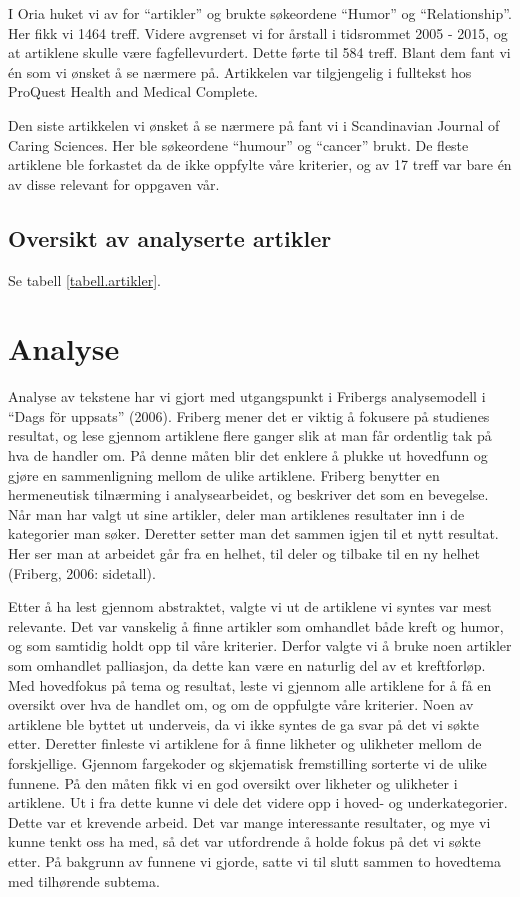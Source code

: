 I Oria huket vi av for “artikler” og brukte søkeordene “Humor” og
“Relationship”. Her fikk vi 1464 treff. Videre avgrenset vi for årstall i
tidsrommet 2005 - 2015, og at artiklene skulle være fagfellevurdert. Dette
førte til 584 treff. Blant dem fant vi én som vi ønsket å se nærmere på.
Artikkelen var tilgjengelig i fulltekst hos ProQuest Health and Medical
Complete.

Den siste artikkelen vi ønsket å se nærmere på fant vi i Scandinavian Journal
of Caring Sciences. Her ble søkeordene “humour” og “cancer” brukt. De fleste
artiklene ble forkastet da de ikke oppfylte våre kriterier, og av 17 treff var
bare én av disse relevant for oppgaven vår.

\subsection{Oversikt av analyserte artikler}

Se tabell \vref{tabell.artikler}.



\section{Analyse}

Analyse av tekstene har vi gjort med utgangspunkt i Fribergs analysemodell i
“Dags för uppsats” (2006). Friberg mener det er viktig å fokusere på studienes
resultat, og lese gjennom artiklene flere ganger slik at man får ordentlig tak
på hva de handler om. På denne måten blir det enklere å plukke ut hovedfunn og
gjøre en sammenligning mellom de ulike artiklene. Friberg benytter en
hermeneutisk tilnærming i analysearbeidet, og beskriver det som en bevegelse.
Når man har valgt ut sine artikler, deler man artiklenes resultater inn i de
kategorier man søker. Deretter setter man det sammen igjen til et nytt
resultat. Her ser man at arbeidet går fra en helhet, til deler og tilbake til
en ny helhet (Friberg, 2006: sidetall).

Etter å ha lest gjennom abstraktet, valgte vi ut de artiklene vi syntes var
mest relevante. Det var vanskelig å finne artikler som omhandlet både kreft og
humor, og som samtidig holdt opp til våre kriterier. Derfor valgte vi å bruke
noen artikler som omhandlet palliasjon, da dette kan være en naturlig del av et
kreftforløp. Med hovedfokus på tema og resultat, leste vi gjennom alle
artiklene for å få en oversikt over hva de handlet om, og om de oppfulgte våre
kriterier. Noen av artiklene ble byttet ut underveis, da vi ikke syntes de ga
svar på det vi søkte etter. Deretter finleste vi artiklene for å finne likheter
og ulikheter mellom de forskjellige. Gjennom fargekoder og skjematisk
fremstilling sorterte vi de ulike funnene. På den måten fikk vi en god oversikt
over likheter og ulikheter i artiklene. Ut i fra dette kunne vi dele det videre
opp i hoved- og underkategorier. Dette var et krevende arbeid. Det var mange
interessante resultater, og mye vi kunne tenkt oss ha med, så det var
utfordrende å holde fokus på det vi søkte etter. På bakgrunn av funnene vi
gjorde, satte vi til slutt sammen to hovedtema med tilhørende  subtema.

